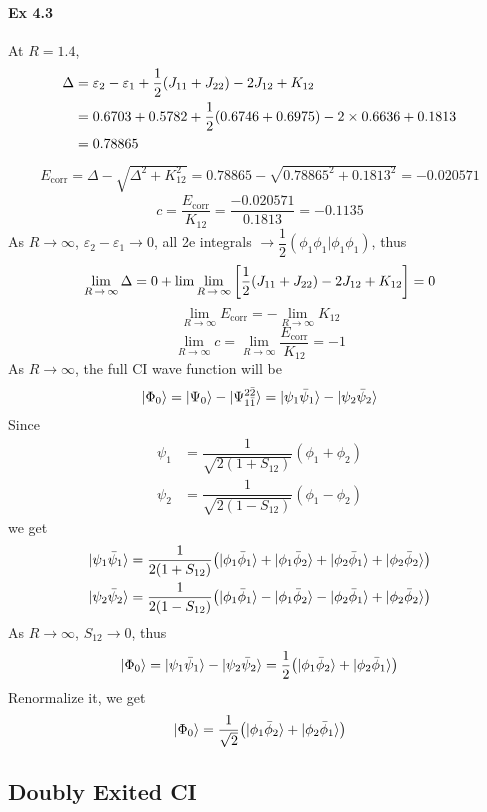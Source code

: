\documentclass[a4paper]{article}
\DeclareMathOperator{\ra}{\rightarrow}
\DeclareMathOperator{\corr}{\mathrm{corr}}
\newcommand{\ex}[1]{\paragraph{Ex #1}}
\numberwithin{equation}{subsection}
\begin{document}
\ex{4.3}
At $ R = 1.4 $,
\begin{align}
\Delta &= \varepsilon_2 - \varepsilon_1 + \dfrac{1}{2}(J_{11} + J_{22}) - 2J_{12} + K_{12} \notag\\
&= 0.6703 + 0.5782 + \dfrac{1}{2}(0.6746 + 0.6975) - 2\times 0.6636 + 0.1813 \notag\\
&= 0.78865
\end{align}
\begin{align}
E_{\corr} = \Delta - \sqrt{\Delta^2 + K_{12}^2} = 0.78865 - \sqrt{0.78865^2 + 0.1813^2} = -0.020571
\end{align}
\begin{equation}\label{key}
c = \dfrac{E_{\corr}}{K_{12}} = \dfrac{-0.020571}{0.1813} = -0.1135
\end{equation}
As $ R\ra\infty $, $ \varepsilon_2 - \varepsilon_1 \ra 0 $, all 2e integrals $ \ra \dfrac{1}{2}(\phi_1\phi_1|\phi_1\phi_1) $, thus
\begin{align}
\lim\limits_{R\ra\infty}\Delta = 0 + \lim\lim\limits_{R\ra\infty} \qty[\dfrac{1}{2}(J_{11} + J_{22}) - 2J_{12} + K_{12}] = 0
\end{align}
\begin{equation}\label{key}
\lim\limits_{R\ra\infty} E_{\corr} =  -\lim\limits_{R\ra\infty} K_{12}
\end{equation}
\begin{equation}\label{key}
\lim\limits_{R\ra\infty} c = \lim\limits_{R\ra\infty} \dfrac{E_{\corr}}{K_{12}} = -1
\end{equation}
As $ R\ra\infty $, the full CI wave function will be
\begin{equation}\label{key}
\ket{\Phi_0} = \ket{\Psi_0} - \ket{\Psi_{1\bar{1}}^{2\bar{2}}} = \ket{\psi_1\bar\psi_1} - \ket{\psi_2\bar\psi_2}
\end{equation}
Since
\begin{align}
\psi_1 &= \dfrac{1}{\sqrt{2(1 + S_{12})}}(\phi_1 + \phi_2) \\
\psi_2 &= \dfrac{1}{\sqrt{2(1 - S_{12})}}(\phi_1 - \phi_2)
\end{align}
we get
\begin{align}
\ket{\psi_1\bar\psi_1} &= \dfrac{1}{2(1 + S_{12})} \qty(\ket{\phi_1\bar\phi_1} + \ket{\phi_1\bar\phi_2} + \ket{\phi_2\bar\phi_1} + \ket{\phi_2\bar\phi_2}) \\
\ket{\psi_2\bar\psi_2} &= \dfrac{1}{2(1 - S_{12})} \qty(\ket{\phi_1\bar\phi_1} - \ket{\phi_1\bar\phi_2} - \ket{\phi_2\bar\phi_1} + \ket{\phi_2\bar\phi_2})
\end{align}
As $ R\ra\infty $, $ S_{12}\ra 0 $, thus
\begin{align}
\ket{\Phi_0} = \ket{\psi_1\bar\psi_1} - \ket{\psi_2\bar\psi_2} = \dfrac{1}{2}\qty(\ket{\phi_1\bar\phi_2} + \ket{\phi_2\bar\phi_1})
\end{align}
Renormalize it, we get
\begin{equation}\label{key}
\ket{\Phi_0} = \dfrac{1}{\sqrt{2}}\qty(\ket{\phi_1\bar\phi_2} + \ket{\phi_2\bar\phi_1})
\end{equation}

\subsection{Doubly Exited CI}
\end{document}
